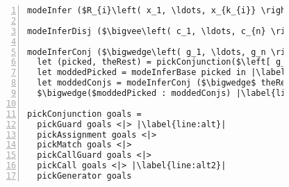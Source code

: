 


\begin{figure}[h]
  \centering
  \begin{minipage}{\columnwidth}
    \begin{lstlisting}[label={fig:modeInference},
                       caption={Mode inference pseudocode},
                       captionpos=b,
                       frame=tb,
                       escapechar=|,
                       numbers=left,
                       numberstyle={\footnotesize}]
modeInfer ($R_{i}\left( x_1, \ldots, x_{k_{i}} \right) \equiv body$) = ($R_{i}\left( x_1, \ldots, x_{k_{i}} \right) \equiv$ (modeInferDisj body)) |\label{line:body}|

modeInferDisj ($\bigvee\left( c_1, \ldots, c_{n} \right)$) = $\bigvee( $modeInferConj $ c_1, \ldots, $ modeInferConj $ c_{n})$ |\label{line:disj}|

modeInferConj ($\bigwedge\left( g_1, \ldots, g_n \right)$) =
  let (picked, theRest) = pickConjunction($\left[ g_1, \ldots, g_n \right]$) in |\label{line:pick}|
  let moddedPicked = modeInferBase picked in |\label{line:pick_analyze}|
  let moddedConjs = modeInferConj ($\bigwedge$ theRest) in |\label{line:conj}|
  $\bigwedge($moddedPicked : moddedConjs) |\label{line:result}|

pickConjunction goals =
  pickGuard goals <|> |\label{line:alt}|
  pickAssignment goals <|>
  pickMatch goals <|>
  pickCallGuard goals <|>
  pickCall goals <|> |\label{line:alt2}|
  pickGenerator goals
    \end{lstlisting}
  \end{minipage}
\end{figure}